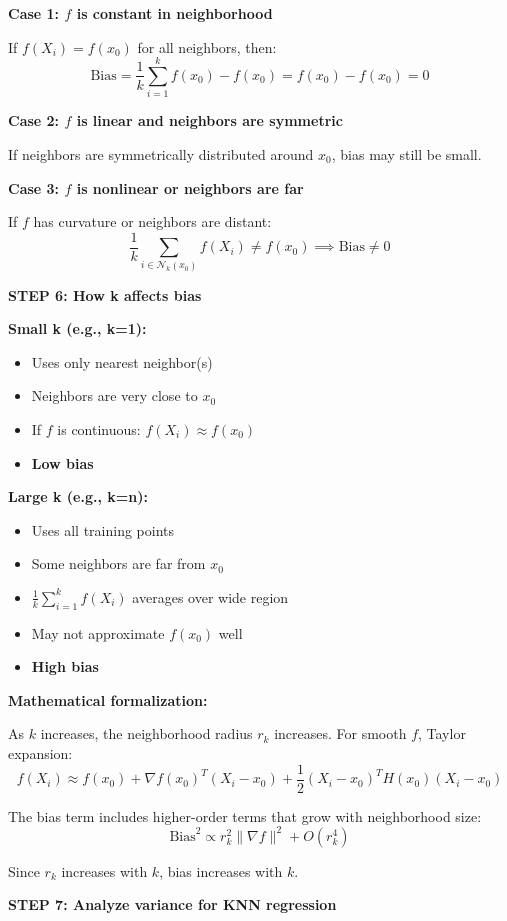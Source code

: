 \documentclass[12pt]{article}
\begin{document}
\begin{solution}
\textbf{Case 1: \(f\) is constant in neighborhood}

If \(f(X_i) = f(x_0)\) for all neighbors, then:
\[
\text{Bias} = \frac{1}{k} \sum_{i=1}^k f(x_0) - f(x_0) = f(x_0) - f(x_0) = 0
\]

\textbf{Case 2: \(f\) is linear and neighbors are symmetric}

If neighbors are symmetrically distributed around \(x_0\), bias may still be small.

\textbf{Case 3: \(f\) is nonlinear or neighbors are far}

If \(f\) has curvature or neighbors are distant:
\[
\frac{1}{k} \sum_{i \in \mathcal{N}_k(x_0)} f(X_i) \neq f(x_0) \implies \text{Bias} \neq 0
\]

\textbf{STEP 6: How k affects bias}

\textbf{Small k (e.g., k=1):}
\begin{itemize}
    \item Uses only nearest neighbor(s)
    \item Neighbors are very close to \(x_0\)
    \item If \(f\) is continuous: \(f(X_i) \approx f(x_0)\)
    \item \textbf{Low bias}
\end{itemize}

\textbf{Large k (e.g., k=n):}
\begin{itemize}
    \item Uses all training points
    \item Some neighbors are far from \(x_0\)
    \item \(\frac{1}{k} \sum_{i=1}^k f(X_i)\) averages over wide region
    \item May not approximate \(f(x_0)\) well
    \item \textbf{High bias}
\end{itemize}

\textbf{Mathematical formalization:}

As \(k\) increases, the neighborhood radius \(r_k\) increases. For smooth \(f\), Taylor expansion:
\[
f(X_i) \approx f(x_0) + \nabla f(x_0)^T (X_i - x_0) + \frac{1}{2}(X_i - x_0)^T H(x_0) (X_i - x_0)
\]

The bias term includes higher-order terms that grow with neighborhood size:
\[
\text{Bias}^2 \propto r_k^2 \|\nabla f\|^2 + O(r_k^4)
\]

Since \(r_k\) increases with \(k\), bias increases with \(k\).

\textbf{STEP 7: Analyze variance for KNN regression}


\end{solution}
\end{document}
